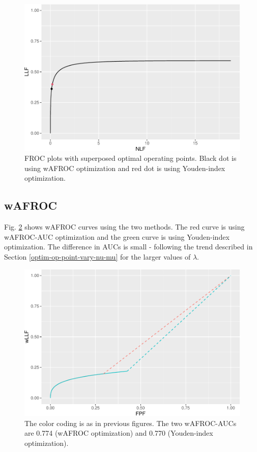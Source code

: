 \documentclass[
]{book}
\begin{document}
\begin{figure}
\centering
\includegraphics{21-optim-op-point_files/figure-latex/optim-op-point-application-froc-1.pdf}
\caption{\label{fig:optim-op-point-application-froc}FROC plots with superposed optimal operating points. Black dot is using wAFROC optimization and red dot is using Youden-index optimization.}
\end{figure}

\hypertarget{wafroc-2}{%
\subsection{wAFROC}\label{wafroc-2}}

Fig. \ref{fig:optim-op-point-application-wafroc} shows wAFROC curves using the two methods. The red curve is using wAFROC-AUC optimization and the green curve is using Youden-index optimization. The difference in AUCs is small - following the trend described in Section \ref{optim-op-point-vary-nu-mu} for the larger values of \(\lambda\).

\begin{figure}
\centering
\includegraphics{21-optim-op-point_files/figure-latex/optim-op-point-application-wafroc-1.pdf}
\caption{\label{fig:optim-op-point-application-wafroc}The color coding is as in previous figures. The two wAFROC-AUCs are 0.774 (wAFROC optimization) and 0.770 (Youden-index optimization).}
\end{figure}
\end{document}
